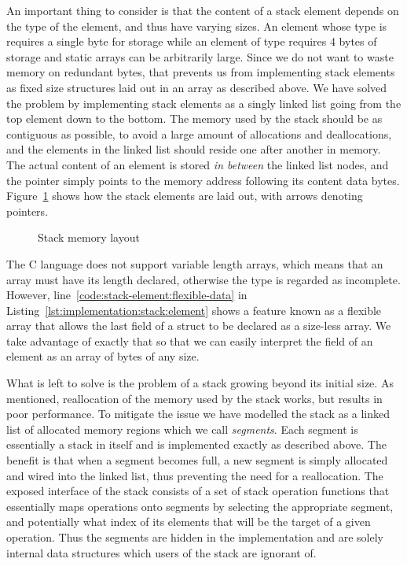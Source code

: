 An important thing to consider is that the content of a stack element depends on
the type of the element, and thus have varying sizes. An element whose type is
 requires a single byte for storage while an element of type
 requires 4 bytes of storage and static arrays can be arbitrarily
large. Since we do not want to waste memory on redundant bytes, that prevents us
from implementing stack elements as fixed size structures laid out in an array
as described above. We have solved the problem by implementing stack elements as
a singly linked list going from the top element down to the bottom. The memory
used by the stack should be as contiguous as possible, to avoid a large amount
of allocations and deallocations, and the elements in the linked list should
reside one after another in memory. The actual content of an element is stored
\textit{in between} the linked list nodes, and the  pointer simply
points to the memory address following its content data
bytes. Figure~\ref{fig:implementation:stack-layout} shows how the stack elements
are laid out, with arrows denoting pointers.

\begin{figure}[H]
  \centering
  
  \caption{Stack memory layout}
  \label{fig:implementation:stack-layout}
\end{figure}

The C language does not support variable length arrays, which means that an
array must have its length declared, otherwise the type is regarded as
incomplete. However, line~\ref{code:stack-element:flexible-data} in
Listing~\ref{lst:implementation:stack:element} shows a feature known as a
flexible array that allows the last field of a struct to be declared as a
size-less array. We take advantage of exactly that so that we can easily
interpret the  field of an element as an array of bytes of any size.

What is left to solve is the problem of a stack growing beyond its initial
size. As mentioned, reallocation of the memory used by the stack works, but
results in poor performance. To mitigate the issue we have modelled the stack as
a linked list of allocated memory regions which we call \textit{segments}. Each
segment is essentially a stack in itself and is implemented exactly as described
above. The benefit is that when a segment becomes full, a new segment is simply
allocated and wired into the linked list, thus preventing the need for a
reallocation. The exposed interface of the stack consists of a set of stack
operation functions that essentially maps operations onto segments by selecting
the appropriate segment, and potentially what index of its elements that will be
the target of a given operation. Thus the segments are hidden in the
implementation and are solely internal data structures which users of the stack
are ignorant of.

